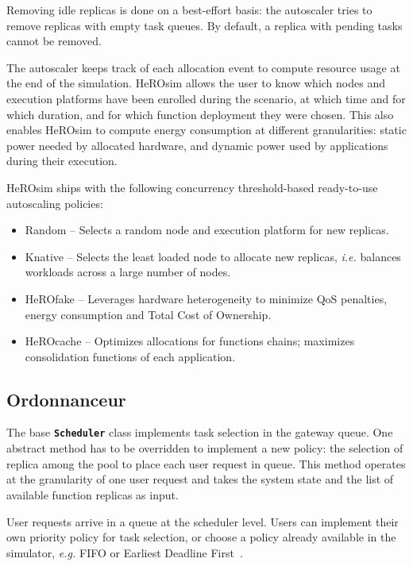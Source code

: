 Removing idle replicas is done on a best-effort basis: the autoscaler tries to remove replicas with empty task queues. By default, a replica with pending tasks cannot be removed.

The autoscaler keeps track of each allocation event to compute resource usage at the end of the simulation. HeROsim allows the user to know which nodes and execution platforms have been enrolled during the scenario, at which time and for which duration, and for which function deployment they were chosen. This also enables HeROsim to compute energy consumption at different granularities: static power needed by allocated hardware, and dynamic power used by applications during their execution.

HeROsim ships with the following concurrency threshold-based ready-to-use autoscaling policies:

\begin{itemize}
    \item Random -- Selects a random node and execution platform for new replicas.
    \item Knative -- Selects the least loaded node to allocate new replicas, \textit{i.e.} balances workloads across a large number of nodes.
    \item HeROfake -- Leverages hardware heterogeneity to minimize QoS penalties, energy consumption and Total Cost of Ownership. %
    \item HeROcache -- Optimizes allocations for functions chains; maximizes consolidation functions of each application. %
\end{itemize}

\subsection{Ordonnanceur}

The base \textbf{\texttt{Scheduler}} class implements task selection in the gateway queue. One abstract method has to be overridden to implement a new policy: the selection of replica among the pool to place each user request in queue. This method operates at the granularity of one user request and takes the system state and the list of available function replicas as input.

User requests arrive in a queue at the scheduler level. Users can implement their own priority policy for task selection, or choose a policy already available in the simulator, \textit{e.g.} FIFO or Earliest Deadline First~\cite{herofake}.


